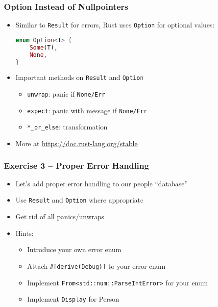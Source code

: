 \begin{frame}[fragile]
    \frametitle{Option Instead of Nullpointers}

    \begin{itemize}
        \item Similar to \texttt{Result} for errors, Rust uses \texttt{Option} for optional values:
        \begin{lstlisting}[language=rust]
enum Option<T> {
    Some(T),
    None,
}
        \end{lstlisting}

    \pause

        \item Important methods on \texttt{Result} and \texttt{Option}
        \begin{itemize}
            \item \texttt{unwrap}: panic if \texttt{None/Err}
            \item \texttt{expect}: panic with message if \texttt{None/Err}
            \item \texttt{*\_or\_else}: transformation
        \end{itemize}

    \pause

        \item More at \url{https://doc.rust-lang.org/stable}
    \end{itemize}
\end{frame}

\begin{frame}[fragile]
    \frametitle{Exercise 3 -- Proper Error Handling}

    \begin{itemize}
        \item Let's add proper error handling to our people ``database''
        \item Use \texttt{Result} and \texttt{Option} where appropriate
        \item Get rid of all panics/unwraps
        \item Hints:
        \begin{itemize}
            \item Introduce your own error enum
            \item Attach \texttt{\#[derive(Debug)]} to your error enum
            \item Implement \texttt{From<std::num::ParseIntError>} for your enum
            \item Implement \texttt{Display} for Person
        \end{itemize}
    \end{itemize}
\end{frame}
